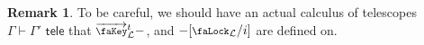 \documentclass[10pt]{article} \usepackage{fullpage}
\theoremstyle{definition}
\newtheorem{remark}[theorem]{Remark}
\newcommand{\yields}{\vdash}
\newcommand{\tele}{\,\,\mathsf{tele}}
\newcommand{\lock}{\mathchoice {\scalebox{0.8}{\text{\faLock}}}
  {\scalebox{0.8}{\text{\faLock}}} {\scalebox{0.5}{\text{\faLock}}}
  {\scalebox{0.4}{\text{\faLock}}} }
\newcommand{\key}{\mathchoice
  {\scalebox{0.8}{\text{\faKey}}} {\scalebox{0.8}{\text{\faKey}}}
  {\scalebox{0.5}{\text{\faKey}}} {\scalebox{0.4}{\text{\faKey}}} }
\newcommand{\lockn}[1]{\mathcal{#1}}
\newcommand{\admkeye}[2]{\overrightarrow{\key}_{#1}^{#2}}
\newcommand{\locksub}[2]{\lock_{\lockn{#1}}/#2}
\begin{document}
\begin{remark}
  To be careful, we should have an actual calculus of telescopes
  $\Gamma \yields \Gamma' \tele$ that $\admkeye{\lockn{L}}{t} -$,
  and $-[\locksub{L}{i}]$ are defined on.
\end{remark}

\end{document}
